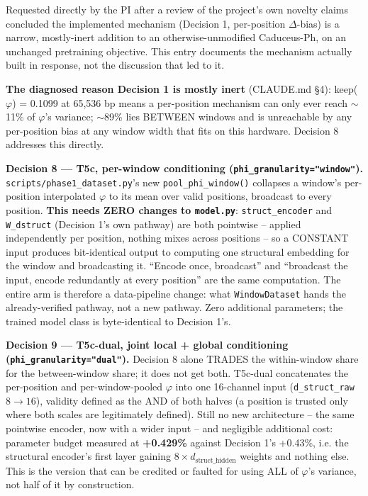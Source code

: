 \documentclass[11pt,a4paper]{article}
\newcommand{\code}[1]{\texttt{\small #1}}
\begin{document}
Requested directly by the PI after a review of the project's own novelty
claims concluded the implemented mechanism (Decision 1, per-position
$\Delta$-bias) is a narrow, mostly-inert addition to an otherwise-unmodified
Caduceus-Ph, on an unchanged pretraining objective. This entry documents
the mechanism actually built in response, not the discussion that led to it.

\textbf{The diagnosed reason Decision 1 is mostly inert} (CLAUDE.md \S4):
keep($\varphi$) = 0.1099 at 65,536 bp means a per-position mechanism can only
ever reach $\sim$11\% of $\varphi$'s variance; $\sim$89\% lies BETWEEN
windows and is unreachable by any per-position bias at any window width that
fits on this hardware. Decision 8 addresses this directly.

\textbf{Decision 8 --- T5c, per-window conditioning
(\code{phi\_granularity="window"}).} \code{scripts/phase1\_dataset.py}'s new
\code{pool\_phi\_window()} collapses a window's per-position interpolated
$\varphi$ to its mean over valid positions, broadcast to every position.
\textbf{This needs ZERO changes to \code{model.py}}: \code{struct\_encoder}
and \code{W\_dstruct} (Decision 1's own pathway) are both pointwise --
applied independently per position, nothing mixes across positions -- so a
CONSTANT input produces bit-identical output to computing one structural
embedding for the window and broadcasting it. ``Encode once, broadcast'' and
``broadcast the input, encode redundantly at every position'' are the same
computation. The entire arm is therefore a data-pipeline change: what
\code{WindowDataset} hands the already-verified pathway, not a new pathway.
Zero additional parameters; the trained model class is byte-identical to
Decision 1's.

\textbf{Decision 9 --- T5c-dual, joint local + global conditioning
(\code{phi\_granularity="dual"}).} Decision 8 alone TRADES the within-window
share for the between-window share; it does not get both. T5c-dual
concatenates the per-position and per-window-pooled $\varphi$ into one
16-channel input (\code{d\_struct\_raw} $8 \to 16$), validity defined as the
AND of both halves (a position is trusted only where both scales are
legitimately defined). Still no new architecture -- the same pointwise
encoder, now with a wider input -- and negligible additional cost: parameter
budget measured at \textbf{+0.429\%} against Decision 1's +0.43\%, i.e. the
structural encoder's first layer gaining $8\times d_{\text{struct\_hidden}}$
weights and nothing else. This is the version that can be credited or
faulted for using ALL of $\varphi$'s variance, not half of it by
construction.
\end{document}
